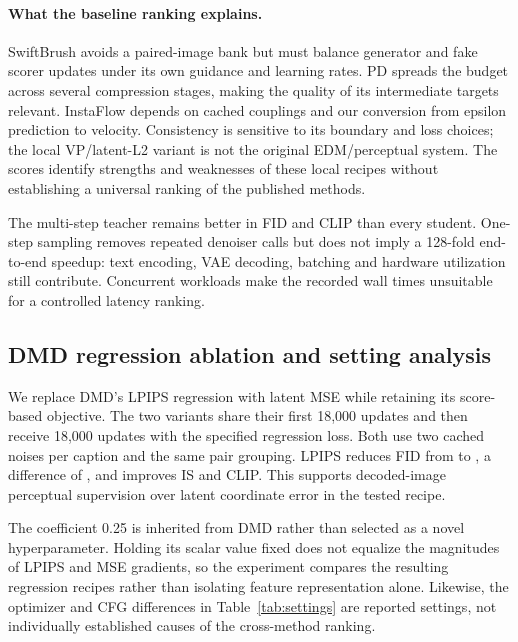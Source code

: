 \documentclass[10pt,twocolumn,letterpaper]{article}
\begin{document}
\paragraph{What the baseline ranking explains.}
SwiftBrush avoids a paired-image bank but must balance generator and fake
scorer updates under its own guidance and learning rates. PD spreads the
budget across several compression stages, making the quality of its
intermediate targets relevant. InstaFlow depends on cached couplings and
our conversion from epsilon prediction to velocity. Consistency is
sensitive to its boundary and loss choices; the local VP/latent-L2 variant
is not the original EDM/perceptual system. The scores identify strengths
and weaknesses of these local recipes without establishing a universal
ranking of the published methods.

The multi-step teacher remains better in FID and CLIP than every student.
One-step sampling removes repeated denoiser calls but does not imply a
128-fold end-to-end speedup: text encoding, VAE decoding, batching and
hardware utilization still contribute. Concurrent workloads make the
recorded wall times unsuitable for a controlled latency ranking.

\subsection{DMD regression ablation and setting analysis}
\begin{table}[t]
\centering\small

\caption{Matched DMD regression-space ablation at 36,000 total updates.
Both variants use the same paired bank, initialization, optimizer state and
caption stream. Regression weight is fixed at 0.25.}
\label{tab:regression}
\end{table}
We replace DMD's LPIPS regression with latent MSE while retaining its
score-based objective. The two variants share their first 18,000 updates
and then receive 18,000 updates with the specified regression loss.
Both use two cached noises per caption and the same pair grouping.
LPIPS reduces FID from \AControlFID{} to \APerceptualFID{}, a difference of
\ARegressionGain{}, and improves IS and CLIP. This supports decoded-image
perceptual supervision over latent coordinate error in the tested recipe.

The coefficient 0.25 is inherited from DMD rather than selected as a novel
hyperparameter. Holding its scalar value fixed does not equalize the
magnitudes of LPIPS and MSE gradients, so the experiment compares the
resulting regression recipes rather than isolating feature representation
alone. Likewise, the optimizer and CFG differences in
Table~\ref{tab:settings} are reported settings, not individually established
causes of the cross-method ranking.
\end{document}
